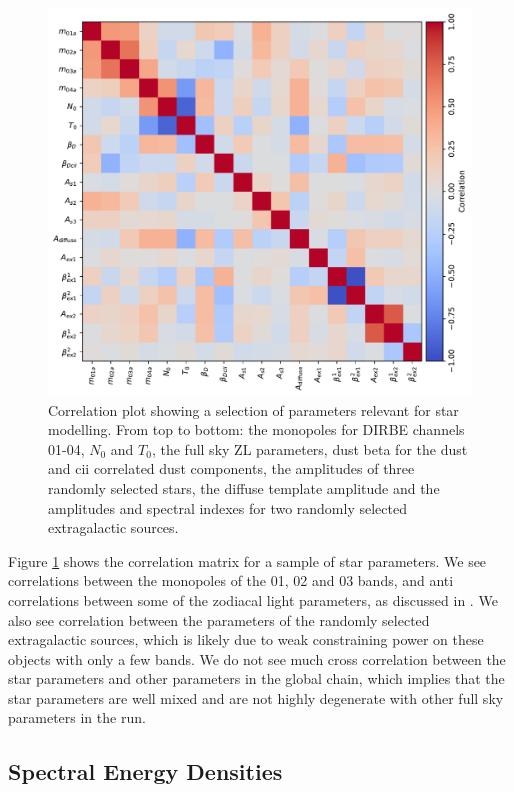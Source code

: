 \documentclass{aa}
\begin{document}
\begin{figure}
  \centering
  \includegraphics[width=\textwidth]{figs/correlation/covmatrix.pdf}
  \caption{Correlation plot showing a selection of parameters relevant for star modelling. From top to bottom: the monopoles for DIRBE channels 01-04, $N_{0}$ and $T_0$, the full sky ZL parameters, dust beta for the dust and cii correlated dust components, the amplitudes of three randomly selected stars, the diffuse template amplitude and the amplitudes and spectral indexes for two randomly selected extragalactic sources.}
  \label{fig:corr}
\end{figure}

Figure \ref{fig:corr} shows the correlation matrix for a sample of star parameters. We see correlations between the monopoles of the 01, 02 and 03 bands, and anti correlations between some of the zodiacal light parameters, as discussed in \citep{CG02_01, CG02_02}. We also see correlation between the parameters of the randomly selected extragalactic sources, which is likely due to weak constraining power on these objects with only a few bands. We do not see much cross correlation between the star parameters and other parameters in the global chain, which implies that the star parameters are well mixed and are not highly degenerate with other full sky parameters in the run.

\subsection{Spectral Energy Densities}
\end{document}
